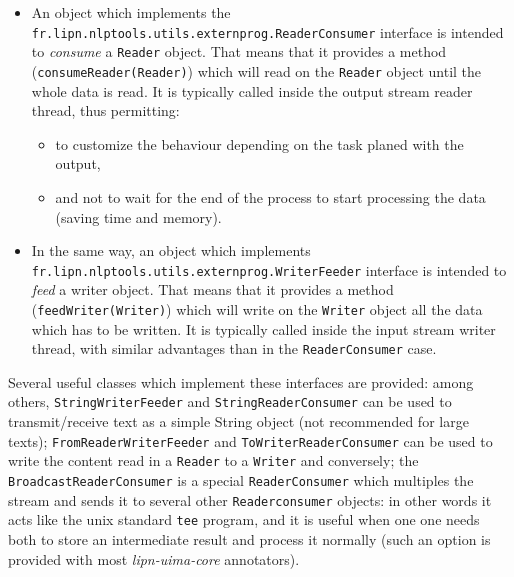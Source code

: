 \documentclass{article}
\newenvironment{xitemize}{
\begin{itemize}
  \setlength{\itemsep}{.3\baselineskip}
  \setlength{\topsep}{0pt}
  \setlength{\parskip}{0pt}
  \setlength{\parsep}{0pt}
}{\end{itemize}}
\newcommand{\packname}{fr.lipn.nlptools}
\newcommand{\utilsPackname}{\packname.utils}
\newcommand{\uimaModule}{{\em lipn-uima-core}\xspace}
\begin{document}
\begin{xitemize}
\item  An object which implements the {\tt \utilsPackname .externprog.ReaderConsumer} interface is intended to {\em consume} a {\tt Reader} object. That means that it provides a method ({\tt consumeReader(Reader)}) which will read on the {\tt Reader} object until the whole data is read. It is typically called inside the output stream reader thread, thus permitting:
\begin{xitemize}
\item to customize the behaviour depending on the task planed with the output,
\item and not to wait for the end of the process to start processing the data (saving time and memory).
\end{xitemize}
\item In the same way, an object which implements {\tt \utilsPackname .externprog.WriterFeeder} interface is intended to {\em feed} a writer object. That means that it provides a method ({\tt feedWriter(Writer)}) which will write on the {\tt Writer} object all the data which has to be written. It is typically called inside the input stream writer thread, with similar advantages than in the {\tt ReaderConsumer} case.
\end{xitemize}

Several useful classes which implement these interfaces are provided: among others, {\tt StringWriterFeeder} and {\tt StringReaderConsumer} can be used to transmit/receive text as a simple String object (not recommended for large texts); {\tt FromReaderWriterFeeder} and {\tt ToWriterReaderConsumer} can be used to write the content read in a {\tt Reader} to a {\tt Writer} and conversely; the {\tt BroadcastReaderConsumer} is a special {\tt ReaderConsumer} which multiples the stream and sends it to several other {\tt Readerconsumer} objects: in other words it acts like the unix standard {\tt tee} program, and it is useful when one one needs both to store an intermediate result and process it normally (such an option is provided with most \uimaModule annotators).
\end{document}
